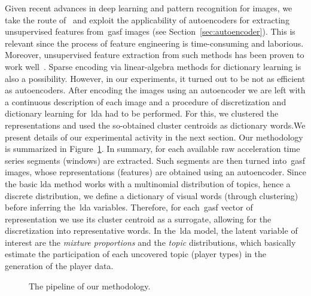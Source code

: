 Given recent advances in deep learning and pattern recognition for images, we take the route of~\citep{wang_encoding_2015} and exploit the applicability of autoencoders for extracting unsupervised features from~\gls{gasf} images (see Section~\ref{sec:autoencoder}). This is relevant since the process of feature engineering is time-consuming and laborious. Moreover, unsupervised feature extraction from such methods has been proven to work well~\citep{wang_imaging_2015, wang_time_2016}.
Sparse encoding via linear-algebra methods for dictionary learning is also a possibility. However, in our experiments, it turned out to be not as efficient as autoencoders. After encoding the images using an autoencoder we are left with a continuous description of each image and a procedure of discretization and dictionary learning for~\gls{lda} had to be performed. For this, we clustered the representations and used the so-obtained cluster centroids as dictionary words.We present details of our experimental activity in the next section. Our methodology is summarized in Figure~\ref{diagram:methodology}. In summary, 
for each available raw acceleration time series segments (windows) are extracted. Such segments are then turned into~\gls{gasf} images, whose representations (features) are obtained using an autoencoder. Since the basic \gls{lda} method works with a multinomial distribution of topics, hence a discrete distribution, we define a dictionary of visual words (through clustering) before inferring the~\gls{lda} variables. Therefore, for each~\gls{gasf} vector of representation we use its cluster centroid as a surrogate, allowing for the discretization into representative words. In the~\gls{lda} model, the latent variable of interest are the \textit{mixture proportions} and the \textit{topic} distributions, which basically estimate the participation of each uncovered topic (player types) in the generation of the player data.

\begin{figure}[h]
	\centering
    \caption{The pipeline of our methodology.}
    \label{diagram:methodology}
\end{figure}

